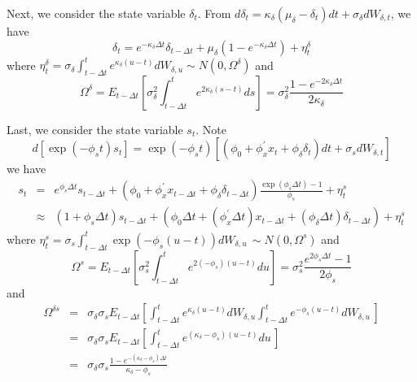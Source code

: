 \documentclass{article}
\begin{document}
Next, we consider the state variable $\delta _{t}$. From $d\delta
_{t}=\kappa _{\delta }\left( \mu _{\delta }-\delta _{t}\right) dt+\sigma
_{\delta }dW_{\delta ,t}$, we have%
\begin{equation*}
\delta _{t}=e^{-\kappa _{\delta }\Delta t}\delta _{t-\Delta t}+\mu _{\delta
}\left( 1-e^{-\kappa _{\delta }\Delta t}\right) +\eta _{t}^{\delta }
\end{equation*}%
where $\eta _{t}^{\delta }=\sigma _{\delta }\int_{t-\Delta t}^{t}e^{\kappa
_{\delta }\left( u-t\right) }dW_{\delta ,u}\sim N\left( 0,\Omega ^{\delta
}\right) $ and%
\begin{equation*}
\Omega ^{\delta }=E_{t-\Delta t}\left[ \sigma _{\delta }^{2}\int_{t-\Delta
t}^{t}e^{2\kappa _{\delta }\left( s-t\right) }ds\right] =\sigma _{\delta
}^{2}\frac{1-e^{-2\kappa _{\delta }\Delta t}}{2\kappa _{\delta }}
\end{equation*}

Last, we consider the state variable $s_{t}$. Note%
\begin{equation*}
d\left[ \exp \left( -\phi _{s}t\right) s_{t}\right] =\exp \left( -\phi
_{s}t\right) \left[ \left( \phi _{0}+\phi _{x}^{\prime }x_{t}+\phi _{\delta
}\delta _{t}\right) dt+\sigma _{s}dW_{\delta ,t}\right] 
\end{equation*}%
we have%
\begin{eqnarray*}
s_{t} &=&e^{\phi _{s}\Delta t}s_{t-\Delta t}+\left( \phi _{0}+\phi
_{x}^{\prime }x_{t-\Delta t}+\phi _{\delta }\delta _{t-\Delta t}\right) 
\frac{\exp \left( \phi _{s}\Delta t\right) -1}{\phi _{s}}+\eta _{t}^{s} \\
&\approx &\left( 1+\phi _{s}\Delta t\right) s_{t-\Delta t}+\left( \phi
_{0}\Delta t+\left( \phi _{x}^{\prime }\Delta t\right) x_{t-\Delta t}+\left(
\phi _{\delta }\Delta t\right) \delta _{t-\Delta t}\right) +\eta _{t}^{s}
\end{eqnarray*}%
where $\eta _{t}^{s}=\sigma _{s}\int_{t-\Delta t}^{t}\exp \left( -\phi
_{s}\left( u-t\right) \right) dW_{\delta ,u}\,\sim N\left( 0,\Omega
^{s}\right) $ and%
\begin{equation*}
\Omega ^{s}=E_{t-\Delta t}\left[ \sigma _{s}^{2}\int_{t-\Delta
t}^{t}e^{2\left( -\phi _{s}\right) \left( u-t\right) }du\right] =\sigma
_{s}^{2}\frac{e^{2\phi _{s}\Delta t}-1}{2\phi _{s}}
\end{equation*}%
and%
\begin{eqnarray*}
\Omega ^{\delta s} &=&\sigma _{\delta }\sigma _{s}E_{t-\Delta t}\left[
\int_{t-\Delta t}^{t}e^{\kappa _{\delta }\left( u-t\right) }dW_{\delta
,u}\int_{t-\Delta t}^{t}e^{-\phi _{s}\left( u-t\right) }dW_{\delta ,u}\,%
\right]  \\
&=&\sigma _{\delta }\sigma _{s}E_{t-\Delta t}\left[ \int_{t-\Delta
t}^{t}e^{\left( \kappa _{\delta }-\phi _{s}\right) \left( u-t\right) }du\,%
\right]  \\
&=&\sigma _{\delta }\sigma _{s}\frac{1-e^{-\left( \kappa _{\delta }-\phi
_{s}\right) \Delta t}}{\kappa _{\delta }-\phi _{s}}
\end{eqnarray*}
\end{document}
